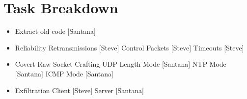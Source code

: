 \documentclass[titlepage]{article}
\begin{document}
\section{Task Breakdown}

\begin{itemize}
	\item Extract old code [Santana]
	\item Reliability
	\subitem Retransmissions [Steve]
	\subitem Control Packets [Steve]
	\subitem Timeouts [Steve]
	\item Covert Raw Socket Crafting
	\subitem UDP Length Mode [Santana]
	\subitem NTP Mode [Santana]
	\subitem ICMP Mode [Santana]
	\item Exfiltration
	\subitem Client [Steve]
	\subitem Server [Santana]
\end{itemize}
\end{document}
